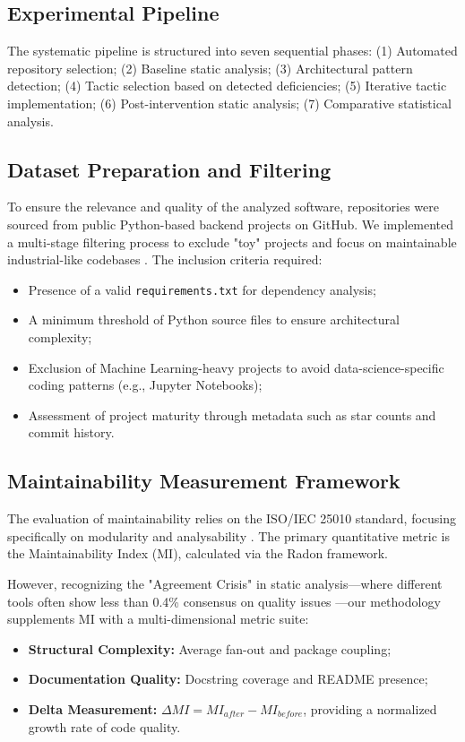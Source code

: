 \documentclass[sigconf,review]{acmart}
\begin{document}
\subsection{Experimental Pipeline}
The systematic pipeline is structured into seven sequential phases: 
(1) Automated repository selection; 
(2) Baseline static analysis; 
(3) Architectural pattern detection; 
(4) Tactic selection based on detected deficiencies; 
(5) Iterative tactic implementation; 
(6) Post-intervention static analysis; 
(7) Comparative statistical analysis.

\subsection{Dataset Preparation and Filtering}
To ensure the relevance and quality of the analyzed software, repositories were sourced from public Python-based backend projects on GitHub. We implemented a multi-stage filtering process to exclude "toy" projects and focus on maintainable industrial-like codebases \cite{rahmati2021ensuring}. The inclusion criteria required:
\begin{itemize}
    \item Presence of a valid \texttt{requirements.txt} for dependency analysis;
    \item A minimum threshold of Python source files to ensure architectural complexity;
    \item Exclusion of Machine Learning-heavy projects to avoid data-science-specific coding patterns (e.g., Jupyter Notebooks);
    \item Assessment of project maturity through metadata such as star counts and commit history.
\end{itemize}

\subsection{Maintainability Measurement Framework}
The evaluation of maintainability relies on the ISO/IEC 25010 standard, focusing specifically on modularity and analysability \cite{bass2021software}. The primary quantitative metric is the Maintainability Index (MI), calculated via the Radon framework. 

However, recognizing the "Agreement Crisis" in static analysis—where different tools often show less than 0.4\% consensus on quality issues \cite{lenarduzzi2023critical}—our methodology supplements MI with a multi-dimensional metric suite:
\begin{itemize}
    \item \textbf{Structural Complexity:} Average fan-out and package coupling;
    \item \textbf{Documentation Quality:} Docstring coverage and README presence;
    \item \textbf{Delta Measurement:} $\Delta MI = MI_{after} - MI_{before}$, providing a normalized growth rate of code quality.
\end{itemize}
\end{document}
